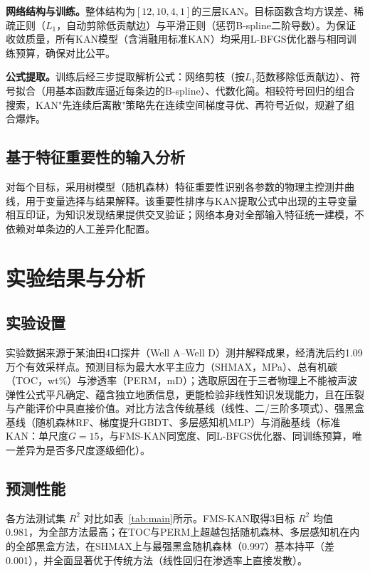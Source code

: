 \documentclass[final,3p,times,twocolumn]{elsarticle}
\begin{document}
\textbf{网络结构与训练。}整体结构为$[12,10,4,1]$的三层KAN。目标函数含均方误差、稀疏正则（$L_1$，自动剪除低贡献边）与平滑正则（惩罚B-spline二阶导数）。为保证收敛质量，所有KAN模型（含消融用标准KAN）均采用L-BFGS优化器与相同训练预算，确保对比公平。

\textbf{公式提取。}训练后经三步提取解析公式：网络剪枝（按$L_1$范数移除低贡献边）、符号拟合（用基本函数库逼近每条边的B-spline）、代数化简。相较符号回归的组合搜索，KAN"先连续后离散"策略先在连续空间梯度寻优、再符号近似，规避了组合爆炸。

\subsection{基于特征重要性的输入分析}

对每个目标，采用树模型（随机森林）特征重要性识别各参数的物理主控测井曲线，用于变量选择与结果解释。该重要性排序与KAN提取公式中出现的主导变量相互印证，为知识发现结果提供交叉验证；网络本身对全部输入特征统一建模，不依赖对单条边的人工差异化配置。

\section{实验结果与分析}

\subsection{实验设置}

实验数据来源于某油田4口探井（Well A--Well D）测井解释成果，经清洗后约1.09万个有效采样点。预测目标为最大水平主应力（SHMAX，MPa）、总有机碳（TOC，wt\%）与渗透率（PERM，mD）；选取原因在于三者物理上不能被声波弹性公式平凡确定、蕴含独立地质信息，更能检验非线性知识发现能力，且在压裂与产能评价中具直接价值。对比方法含传统基线（线性、二/三阶多项式）、强黑盒基线（随机森林RF、梯度提升GBDT、多层感知机MLP）与消融基线（标准KAN：单尺度$G{=}15$，与FMS-KAN同宽度、同L-BFGS优化器、同训练预算，唯一差异为是否多尺度逐级细化）。

\subsection{预测性能}

各方法测试集 $R^2$ 对比如表~\ref{tab:main}所示。FMS-KAN取得3目标 $R^2$ 均值 0.981，为全部方法最高；在TOC与PERM上超越包括随机森林、多层感知机在内的全部黑盒方法，在SHMAX上与最强黑盒随机森林（0.997）基本持平（差0.001），并全面显著优于传统方法（线性回归在渗透率上直接发散）。
\end{document}
